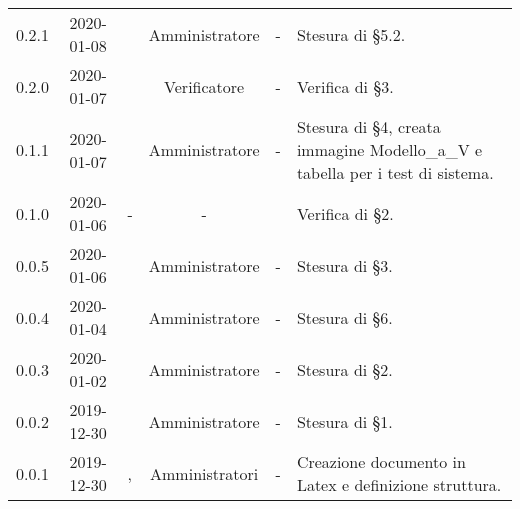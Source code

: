 {\begin{longtable}{ c c  C{2.3cm} c C{3cm} C{3.2cm}}
0.2.1 & 2020-01-08 & \AT{} & Amministratore & - & Stesura di §5.2. \\
0.2.0 & 2020-01-07 & \DF{} & Verificatore & - & Verifica di §3. \\
0.1.1 & 2020-01-07 & \AT{} & Amministratore & - & Stesura di §4, creata immagine Modello\_a\_V e tabella per i test di sistema. \\
0.1.0 & 2020-01-06 & - & - & \LD{} & Verifica di §2. \\
0.0.5 & 2020-01-06 & \BR{} & Amministratore & - & Stesura di §3. \\
0.0.4 & 2020-01-04 & \MC{} & Amministratore & - & Stesura di §6. \\
0.0.3 & 2020-01-02 & \MC{} & Amministratore & - & Stesura di §2. \\
0.0.2 & 2019-12-30 & \AT{} & Amministratore & - & Stesura di §1. \\
0.0.1 & 2019-12-30 & \AT{}, \MC{} & Amministratori & - & Creazione documento in Latex e definizione struttura. \\

\end{longtable}
}
